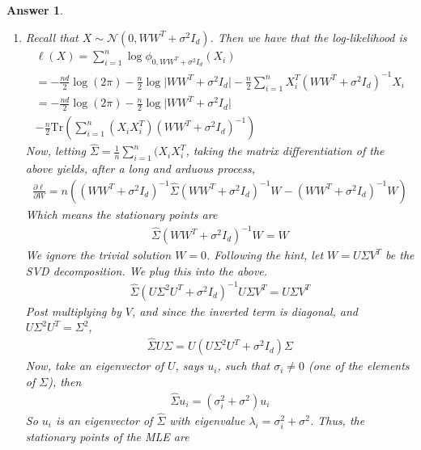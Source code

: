\documentclass[12pt]{article}
\theoremstyle{colon}
\newtheorem*{answer}{Answer}
\begin{document}
\begin{answer}
\begin{enumerate}[label=\arabic*)]
    \item Recall that $X \sim \mathcal{N} (0, W W^T + \sigma^2 I_d)$. Then we have that the log-likelihood is
      \begin{gather*}
        \ell (X) = \sum_{i=1}^n \log \phi_{0, W W^T + \sigma^2 I_d} (X_i) \\
        = -\frac{nd}{2} \log(2 \pi) - \frac{n}{2} \log \lvert W W^T + \sigma^2 I_d \rvert - \frac{n}{2} \sum_{i=1}^n X_i^T (W W^T + \sigma^2 I_d)^{-1} X_i \\
        = -\frac{nd}{2} \log(2 \pi) - \frac{n}{2} \log \lvert W W^T + \sigma^2 I_d \rvert \\
        - \frac{n}{2} \text{Tr} \left( \sum_{i=1}^n (X_i X_i^T)(W W^T + \sigma^2 I_d)^{-1} \right)
      \end{gather*}
      Now, letting $\hat{\Sigma} = \frac{1}{n} \sum_{i=1}^n (X_i X_i^T$, taking the matrix differentiation of the above yields, after a long and arduous process,
      \begin{gather*}
        \frac{\partial \ell}{\partial W} = n ( (W W^T + \sigma^2 I_d)^{-1} \hat{\Sigma} (W W^T + \sigma^2 I_d)^{-1} W - (W W^T + \sigma^2 I_d)^{-1} W )
      \end{gather*}
      Which means the stationary points are
      \begin{gather*}
        \hat{\Sigma} (W W^T + \sigma^2 I_d)^{-1} W = W
      \end{gather*}
      We ignore the trivial solution $W = 0$. Following the hint, let $W = U \Sigma V^T$ be the SVD decomposition. We plug this into the above.
      \begin{gather*}
        \hat{\Sigma} (U \Sigma^2 U^T + \sigma^2 I_d)^{-1} U \Sigma V^T = U \Sigma V^T
      \end{gather*}
      Post multiplying by $V$, and since the inverted term is diagonal, and $U \Sigma^2 U^T = \Sigma^2$,
      \begin{gather*}
        \hat{\Sigma} U \Sigma = U (U \Sigma^2 U^T+ \sigma^2 I_d) \Sigma
      \end{gather*}
      Now, take an eigenvector of $U$, says $u_i$, such that $\sigma_i \neq 0$ (one of the elements of $\Sigma$), then
      \begin{gather*}
        \hat{\Sigma} u_i = (\sigma_i^2 + \sigma^2) u_i
      \end{gather*}
      So $u_i$ is an eigenvector of $\hat{\Sigma}$ with eigenvalue $\lambda_i = \sigma_i^2 + \sigma^2$. Thus, the stationary points of the MLE are
      \begin{gather*}

\end{gather*}
\end{enumerate}
\end{answer}
\end{document}

